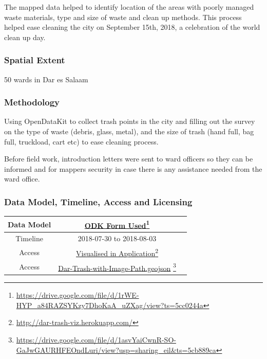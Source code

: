 \documentclass[a4paper,12pt,twoside]{article}
\begin{document}
The mapped data helped to identify location of the areas with poorly managed waste materials, type and size of waste and clean up methods. This process helped ease cleaning the city on September 15th, 2018, a celebration of the world clean up day.

\subsubsection{Spatial Extent}
50 wards in Dar es Salaam

\subsubsection{Methodology}
Using OpenDataKit to collect trash points in the city and filling out the survey on the type of waste (debris, glass, metal), and the size of trash (hand full, bag full, truckload, cart etc) to ease cleaning process.
\medskip

Before field work, introduction letters were sent to ward officers so they can be informed and for mappers security in case there is any assistance needed from the ward office.

\medskip
\subsubsection{Data Model, Timeline, Access and Licensing}
\begin{center}
\begin{tabular}{|c|c|c|}  

 \hline
Data Model &
\href{https://drive.google.com/file/d/1rWE-HYP_a84RAZSYKzy7DhoKaA_uZXag/view?ts=5cc0244a}{ODK Form Used}\footnote{\url{https://drive.google.com/file/d/1rWE-HYP_a84RAZSYKzy7DhoKaA_uZXag/view?ts=5cc0244a}} \\
 \hline
  Timeline  &  2018-07-30 to 2018-08-03 \\
\hline  
 Access  & 
   \href{http://dar-trash-viz.herokuapp.com/}{Visualised in Application}\footnote{\url{http://dar-trash-viz.herokuapp.com/}} \\
   Access  &  \href{https://drive.google.com/file/d/1asvYaiCwnR-SO-GaJwGAURHFEOndLuri/view?usp=sharing_eil&ts=5cb889ca}{Dar-Trash-with-Image-Path.geojson}
    \footnote{\url{https://drive.google.com/file/d/1asvYaiCwnR-SO-GaJwGAURHFEOndLuri/view?usp=sharing_eil&ts=5cb889ca}} \\
\hline
\hline
\end{tabular}
\end{center}
\end{document}
